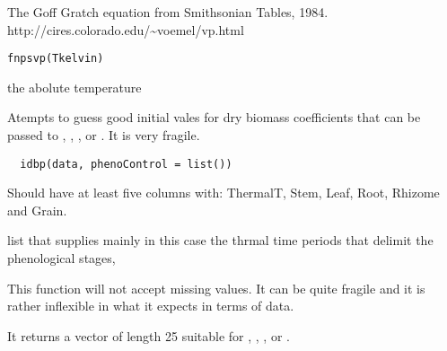\documentclass[letterpaper]{book}
\begin{document}
%
\begin{Description}\relax
The Goff Gratch equation from Smithsonian Tables, 1984.
http://cires.colorado.edu/\textasciitilde{}voemel/vp.html
\end{Description}
%
\begin{Usage}
\begin{verbatim}
fnpsvp(Tkelvin)
\end{verbatim}
\end{Usage}
%
\begin{Arguments}
\begin{ldescription}
\item[\code{Tkelvin}] the abolute temperature
\end{ldescription}
\end{Arguments}
%
\begin{Description}\relax
Atempts to guess good initial vales for dry biomass
coefficients that can be passed to ,
, , or
.  It is very fragile.
\end{Description}
%
\begin{Usage}
\begin{verbatim}
  idbp(data, phenoControl = list())
\end{verbatim}
\end{Usage}
%
\begin{Arguments}
\begin{ldescription}
\item[\code{data}] Should have at least five columns with:
ThermalT, Stem, Leaf, Root, Rhizome and Grain.

\item[\code{phenoControl}] list that supplies mainly in this
case the thrmal time periods that delimit the
phenological stages,
\end{ldescription}
\end{Arguments}
%
\begin{Details}\relax
This function will not accept missing values. It can be
quite fragile and it is rather inflexible in what it
expects in terms of data.
\end{Details}
%
\begin{Value}
It returns a vector of length 25 suitable for
, , , or
.
\end{Value}
\end{document}

